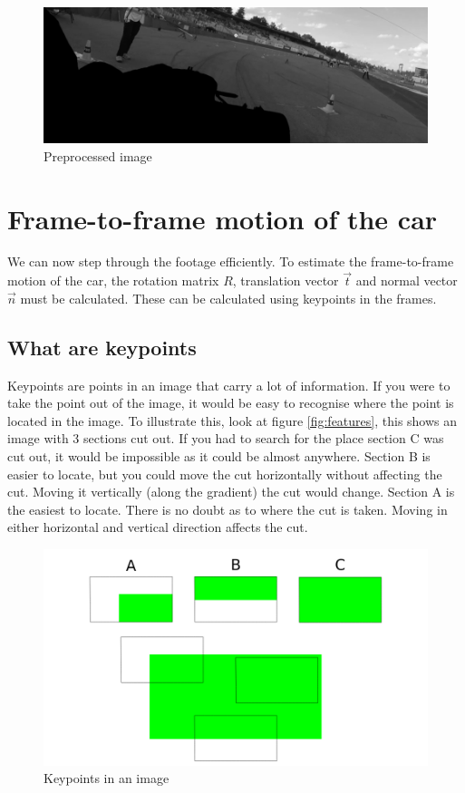 \begin{figure}
    \centering
    \includegraphics[width=1\textwidth]{figures/output_image.jpg}
    \caption{Preprocessed image}
    \label{fig:output_image}
\end{figure}

\section{Frame-to-frame motion of the car}
We can now step through the footage efficiently. To estimate the frame-to-frame motion of the car, the rotation matrix \underline{${R}$}, translation vector $\vec{t}$ and normal vector $\vec{n}$ must be calculated. These can be calculated using keypoints in the frames. 

\subsection{What are keypoints}
Keypoints are points in an image that carry a lot of information. If you were to take the point out of the image, it would be easy to recognise where the point is located in the image. To illustrate this, look at figure \autoref{fig:features}, this shows an image with 3 sections cut out. If you had to search for the place section C was cut out, it would be impossible as it could be almost anywhere. Section B is easier to locate, but you could move the cut horizontally without affecting the cut. Moving it vertically (along the gradient) the cut would change. Section A is the easiest to locate. There is no doubt as to where the cut is taken. Moving in either horizontal and vertical direction affects the cut.\bigskip

\begin{figure}
    \centering
    \includegraphics[width=1\textwidth]{figures/features.png}
    \caption{Keypoints in an image}
    \label{fig:features}
\end{figure}

